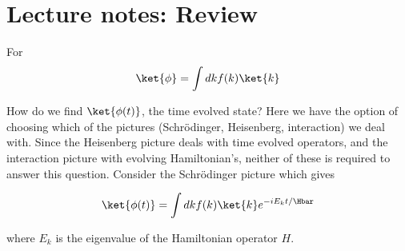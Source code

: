 %
%
\section{Lecture notes: Review}

For
\begin{align*}
\ket{\phi} = \int dk f(k) \ket{k}
\end{align*}

How do we find $\ket{\phi(t)}$, the time evolved state?  Here we have the option of choosing which of the pictures (Schr\"{o}dinger, Heisenberg, interaction) we deal with.  Since the Heisenberg picture deals with time evolved operators, and the interaction picture with evolving Hamiltonian's, neither of these is required to answer this question.  Consider the Schr\"{o}dinger picture which gives

\begin{align*}
\ket{\phi(t)} = \int dk f(k) \ket{k} e^{-i E_k t/\Hbar}
\end{align*}

where $E_k$ is the eigenvalue of the Hamiltonian operator $H$.


